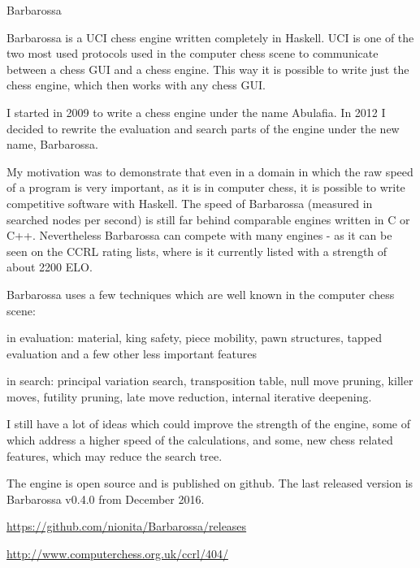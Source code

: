 \begin{hcarentry}{Barbarossa}
\makeheader

Barbarossa is a UCI chess engine written completely in Haskell. UCI is one of
the two most used protocols used in the computer chess scene to communicate
between a chess GUI and a chess engine. This way it is possible to write just
the chess engine, which then works with any chess GUI.

I started in 2009 to write a chess engine under the name Abulafia. In 2012 I
decided to rewrite the evaluation and search parts of the engine under the new
name, Barbarossa.

My motivation was to demonstrate that even in a domain in which the raw speed
of a program is very important, as it is in computer chess, it is possible to
write competitive software with Haskell. The speed of Barbarossa (measured in
searched nodes per second) is still far behind comparable engines written in C
or C++. Nevertheless Barbarossa can compete with many engines - as it can be
seen on the CCRL rating lists, where is it currently listed with a strength of
about 2200 ELO.

Barbarossa uses a few techniques which are well known in the computer chess
scene:

\begin{compactitem}
\item in evaluation: material, king safety, piece mobility, pawn structures,
  tapped evaluation and a few other less important features
\item in search: principal variation search, transposition table, null move
  pruning, killer moves, futility pruning, late move reduction, internal
  iterative deepening.
\end{compactitem}

I still have a lot of ideas which could improve the strength of the engine,
some of which address a higher speed of the calculations, and some, new
chess related features, which may reduce the search tree.

The engine is open source and is published on github. The last released
version is Barbarossa v0.4.0 from December 2016.

\FurtherReading
\begin{compactitem}
\item\url{https://github.com/nionita/Barbarossa/releases}
\item\url{http://www.computerchess.org.uk/ccrl/404/}
\end{compactitem}
\end{hcarentry}
